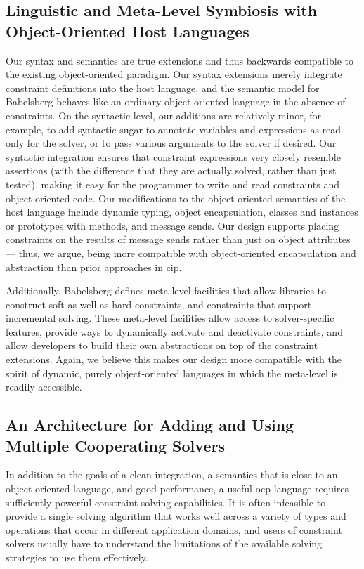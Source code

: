 \subsection{Linguistic and Meta-Level Symbiosis with Object-Oriented Host Languages}
Our syntax and semantics are true extensions and thus backwards
compatible to the existing object-oriented paradigm. Our syntax
extensions merely integrate constraint definitions into the host
language, and the semantic model for Babelsberg behaves like an
ordinary object-oriented language in the absence of constraints. On
the syntactic level, our additions are relatively minor, for example,
to add syntactic sugar to annotate variables and expressions as
read-only for the solver, or to pass various arguments to the solver
if desired. Our syntactic integration ensures that constraint
expressions very closely resemble assertions (with the difference that
they are actually solved, rather than just tested), making it easy for
the programmer to write and read constraints and object-oriented code.
Our modifications to the object-oriented semantics of the host
language include dynamic typing, object encapsulation, classes and
instances or prototypes with methods, and message sends. Our design
supports placing constraints on the results of message sends rather
than just on object attributes --- thus, we argue, being more
compatible with object-oriented encapsulation and abstraction than
prior approaches in \ac{cip}.

Additionally, Babelsberg defines meta-level facilities that allow
libraries to construct soft as well as hard constraints, and
constraints that support incremental solving. These meta-level
facilities allow access to solver-specific features, provide ways to
dynamically activate and deactivate constraints, and allow developers
to build their own abstractions on top of the constraint
extensions. Again, we believe this makes our design more compatible
with the spirit of dynamic, purely object-oriented languages in which
the meta-level is readily accessible.

\subsection{An Architecture for Adding and Using Multiple Cooperating Solvers}
In addition to the goals of a clean integration, a semantics that is
close to an object-oriented language, and good performance, a useful
\ac{ocp} language requires sufficiently powerful constraint solving
capabilities. It is often infeasible to provide a single solving
algorithm that works well across a variety of types and operations
that occur in different application domains, and users of constraint
solvers usually have to understand the limitations of the available
solving strategies to use them effectively.


